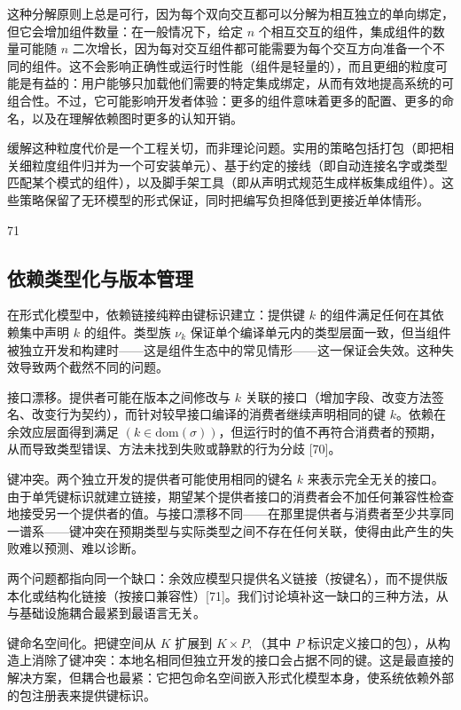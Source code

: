 \documentclass[
  10
]{article}
\begin{document}
这种分解原则上总是可行，因为每个双向交互都可以分解为相互独立的单向绑定，但它会增加组件数量：在一般情况下，给定 \(n\) 个相互交互的组件，集成组件的数量可能随 \(n\) 二次增长，因为每对交互组件都可能需要为每个交互方向准备一个不同的组件。这不会影响正确性或运行时性能（组件是轻量的），而且更细的粒度可能是有益的：用户能够只加载他们需要的特定集成绑定，从而有效地提高系统的可组合性。不过，它可能影响开发者体验：更多的组件意味着更多的配置、更多的命名，以及在理解依赖图时更多的认知开销。

缓解这种粒度代价是一个工程关切，而非理论问题。实用的策略包括打包（即把相关细粒度组件归并为一个可安装单元）、基于约定的接线（即自动连接名字或类型匹配某个模式的组件），以及脚手架工具（即从声明式规范生成样板集成组件）。这些策略保留了无环模型的形式保证，同时把编写负担降低到更接近单体情形。

71

\subsection{依赖类型化与版本管理} \label{dependency-typing-and-versioning}

在形式化模型中，依赖链接纯粹由键标识建立：提供键 \(k\) 的组件满足任何在其依赖集中声明 \(k\) 的组件。类型族 \(\nu _ { k }\) 保证单个编译单元内的类型层面一致，但当组件被独立开发和构建时——这是组件生态中的常见情形——这一保证会失效。这种失效导致两个截然不同的问题。

接口漂移。提供者可能在版本之间修改与 \(k\) 关联的接口（增加字段、改变方法签名、改变行为契约），而针对较早接口编译的消费者继续声明相同的键 \(k\)。依赖在余效应层面得到满足 \(( k \in \mathrm { d o m } ( \sigma ) )\)，但运行时的值不再符合消费者的预期，从而导致类型错误、方法未找到失败或静默的行为分歧 {[}70{]}。

键冲突。两个独立开发的提供者可能使用相同的键名 \(k\) 来表示完全无关的接口。由于单凭键标识就建立链接，期望某个提供者接口的消费者会不加任何兼容性检查地接受另一个提供者的值。与接口漂移不同——在那里提供者与消费者至少共享同一谱系——键冲突在预期类型与实际类型之间不存在任何关联，使得由此产生的失败难以预测、难以诊断。

两个问题都指向同一个缺口：余效应模型只提供名义链接（按键名），而不提供版本化或结构化链接（按接口兼容性）{[}71{]}。我们讨论填补这一缺口的三种方法，从与基础设施耦合最紧到最语言无关。

键命名空间化。把键空间从 \(K\) 扩展到 \(K \times P ,\)（其中 \(P\) 标识定义接口的包），从构造上消除了键冲突：本地名相同但独立开发的接口会占据不同的键。这是最直接的解决方案，但耦合也最紧：它把包命名空间嵌入形式化模型本身，使系统依赖外部的包注册表来提供键标识。
\end{document}
